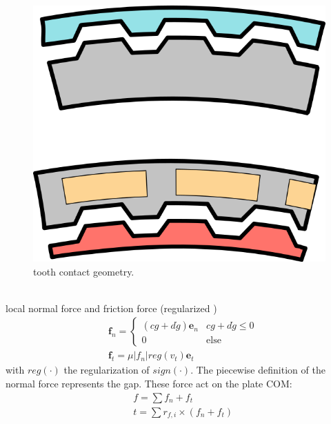 \documentclass[a4paper,fleqn]{cas-dc}
\begin{document}
\begin{figure}
	\centering
	\includegraphics[scale=.75]{figs/toothcontacts.png}
	\caption{tooth contact geometry.}
	\label{fig:teeth}
\end{figure}\\
local normal force and friction force (regularized \cite{vielsack1996regularisierung}) 
\begin{align}
	& \boldsymbol{f}_n = \left\{
	\begin{array}{ll}
	(c g + d \dot g)\boldsymbol{e}_n & c g + d \dot g \leq 0\\
	0 & \textrm{else}
	\end{array}\right.\\
	& \boldsymbol{f}_t = \mu |f_n | reg(v_t) \boldsymbol{e}_t
\end{align}
with $reg(\cdot)$ the regularization of $sign(\cdot)$. The piecewise definition of the normal force represents the gap. These force act on the plate COM: 
\begin{align}
	& f = \sum f_n + f_t\\
	& t = \sum r_{f,i}\times \left(f_n + f_t\right)
\end{align}
\end{document}
